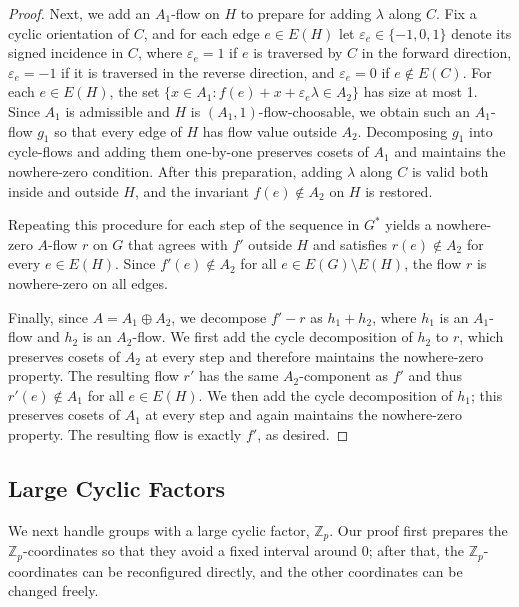 \documentclass[a4paper,12pt]{article}
\theoremstyle{plain}
\theoremstyle{definition}
\newcommand{\Z}{\mathbb{Z}}
\begin{document}
\begin{proof}
Next, we add an $A_1$-flow on $H$ to prepare for adding $\lambda$ along $C$. Fix a cyclic orientation of $C$, and for each edge $e\in E(H)$ let $\varepsilon_e\in\{-1,0,1\}$ denote its signed incidence in $C$, where $\varepsilon_e=1$ if $e$ is traversed by $C$ in the forward direction, $\varepsilon_e=-1$ if it is traversed in the reverse direction, and $\varepsilon_e=0$ if $e\notin E(C)$. For each $e\in E(H)$, the set $\{x\in A_1: f(e)+x+\varepsilon_e\lambda\in A_2\}$ has size at most 1. Since $A_1$ is admissible and $H$ is $(A_1,1)$-flow-choosable, we obtain such an $A_1$-flow $g_1$ so that every edge of $H$ has flow value outside $A_2$. Decomposing $g_1$ into cycle-flows and adding them one-by-one preserves cosets of $A_1$ and maintains the nowhere-zero condition. After this preparation, adding $\lambda$ along $C$ is valid both inside and outside $H$, and the invariant $f(e)\notin A_2$ on $H$ is restored.

Repeating this procedure for each step of the sequence in $G^*$ yields a nowhere-zero $A$-flow $r$ on $G$ that agrees with $f'$ outside $H$ and satisfies $r(e)\notin A_2$ for every $e\in E(H)$. Since $f'(e)\notin A_2$ for all $e\in E(G)\setminus E(H)$, the flow $r$ is nowhere-zero on all edges.

Finally, since $A=A_1\oplus A_2$, we decompose $f'-r$ as $h_1+h_2$, where $h_1$ is an $A_1$-flow and $h_2$ is an $A_2$-flow. We first add the cycle decomposition of $h_2$ to $r$, which preserves cosets of $A_2$ at every step and therefore maintains the nowhere-zero property. The resulting flow $r'$ has the same $A_2$-component as $f'$ and thus $r'(e)\notin A_1$ for all $e\in E(H)$. We then add the cycle decomposition of $h_1$; this preserves cosets of $A_1$ at every step and again maintains the nowhere-zero property. The resulting flow is exactly $f'$, as desired.
\end{proof}


\subsection{Large Cyclic Factors}

We next handle groups with a large cyclic factor, $\Z_p$.  Our proof first prepares the $\Z_p$-coordinates so that they avoid a fixed interval around $0$; after that, the $\Z_p$-coordinates can be reconfigured directly, and the other coordinates can be changed freely.
\end{document}
